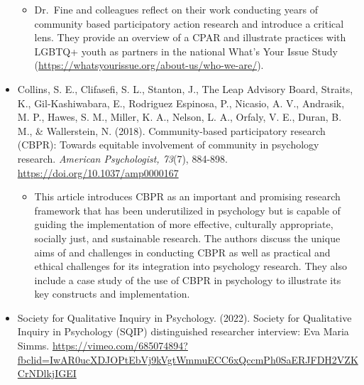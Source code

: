 \documentclass[
  11pt,
]{book}
\providecommand{\tightlist}{%
  \setlength{\itemsep}{0pt}\setlength{\parskip}{0pt}}
\begin{document}
\begin{itemize}
  \begin{itemize}
  \tightlist
  \item
    Dr.~Fine and colleagues reflect on their work conducting years of community based participatory action research and introduce a critical lens. They provide an overview of a CPAR and illustrate practices with LGBTQ+ youth as partners in the national What's Your Issue Study (\url{https://whatsyourissue.org/about-us/who-we-are/}).
  \end{itemize}
\item
  Collins, S. E., Clifasefi, S. L., Stanton, J., The Leap Advisory Board, Straits, K., Gil-Kashiwabara, E., Rodriguez Espinosa, P., Nicasio, A. V., Andrasik, M. P., Hawes, S. M., Miller, K. A., Nelson, L. A., Orfaly, V. E., Duran, B. M., \& Wallerstein, N. (2018). Community-based participatory research (CBPR): Towards equitable involvement of community in psychology research. \emph{American Psychologist, 73}(7), 884-898. \url{https://doi.org/10.1037/amp0000167}

  \begin{itemize}
  \tightlist
  \item
    This article introduces CBPR as an important and promising research framework that has been underutilized in psychology but is capable of guiding the implementation of more effective, culturally appropriate, socially just, and sustainable research. The authors discuss the unique aims of and challenges in conducting CBPR as well as practical and ethical challenges for its integration into psychology research. They also include a case study of the use of CBPR in psychology to illustrate its key constructs and implementation.
  \end{itemize}
\item
  Society for Qualitative Inquiry in Psychology. (2022). Society for Qualitative Inquiry in Psychology (SQIP) distinguished researcher interview: Eva Maria Simms. \url{https://vimeo.com/685074894?fbclid=IwAR0ucXDJOPtEbVj9kVgtWmmuECC6xQccmPh0SaERJFDH2VZKCrNDlkjIGEI}


\end{itemize}
\end{document}

